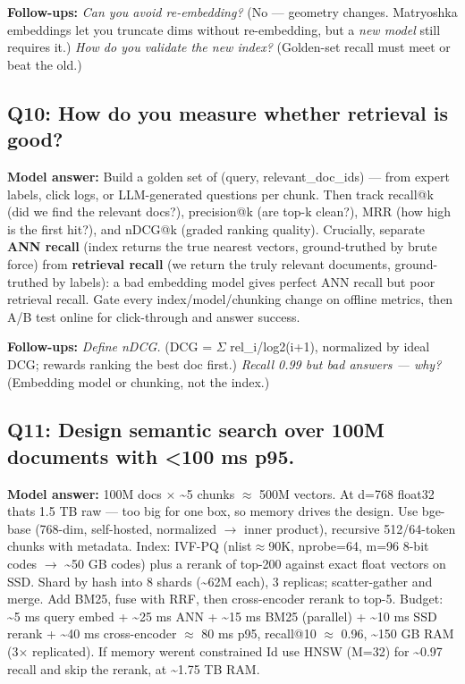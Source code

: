 \documentclass[11pt]{article}
\begin{document}
\textbf{Follow-ups:} \emph{Can you avoid re-embedding?} (No --- geometry changes. Matryoshka embeddings let you truncate dims without re-embedding, but a \emph{new model} still requires it.) \emph{How do you validate the new index?} (Golden-set recall must meet or beat the old.)

\subsection{Q10: How do you measure whether retrieval is good?}\label{q10-how-do-you-measure-whether-retrieval-is-good}

\textbf{Model answer:} Build a golden set of (query, relevant\_doc\_ids) --- from expert labels, click logs, or LLM-generated questions per chunk. Then track recall@k (did we find the relevant docs?), precision@k (are top-k clean?), MRR (how high is the first hit?), and nDCG@k (graded ranking quality). Crucially, separate \textbf{ANN recall} (index returns the true nearest vectors, ground-truthed by brute force) from \textbf{retrieval recall} (we return the truly relevant documents, ground-truthed by labels): a bad embedding model gives perfect ANN recall but poor retrieval recall. Gate every index/model/chunking change on offline metrics, then A/B test online for click-through and answer success.

\textbf{Follow-ups:} \emph{Define nDCG.} (DCG = \(\Sigma\) rel\_i/log2(i+1), normalized by ideal DCG; rewards ranking the best doc first.) \emph{Recall 0.99 but bad answers --- why?} (Embedding model or chunking, not the index.)

\subsection{Q11: Design semantic search over 100M documents with \textless100 ms p95.}\label{q11-design-semantic-search-over-100m-documents-with-100-ms-p95}

\textbf{Model answer:} 100M docs \(\times\) \textasciitilde5 chunks \(\approx\) 500M vectors. At d=768 float32 that\textquotesingle s 1.5 TB raw --- too big for one box, so memory drives the design. Use bge-base (768-dim, self-hosted, normalized \(\rightarrow\) inner product), recursive 512/64-token chunks with metadata. Index: IVF-PQ (nlist\(\approx\)90K, nprobe=64, m=96 8-bit codes \(\rightarrow\) \textasciitilde50 GB codes) plus a rerank of top-200 against exact float vectors on SSD. Shard by hash into 8 shards (\textasciitilde62M each), 3 replicas; scatter-gather and merge. Add BM25, fuse with RRF, then cross-encoder rerank to top-5. Budget: \textasciitilde5 ms query embed + \textasciitilde25 ms ANN + \textasciitilde15 ms BM25 (parallel) + \textasciitilde10 ms SSD rerank + \textasciitilde40 ms cross-encoder \(\approx\) 80 ms p95, recall@10 \(\approx\) 0.96, \textasciitilde150 GB RAM (3\(\times\) replicated). If memory weren\textquotesingle t constrained I\textquotesingle d use HNSW (M=32) for \textasciitilde0.97 recall and skip the rerank, at \textasciitilde1.75 TB RAM.
\end{document}

